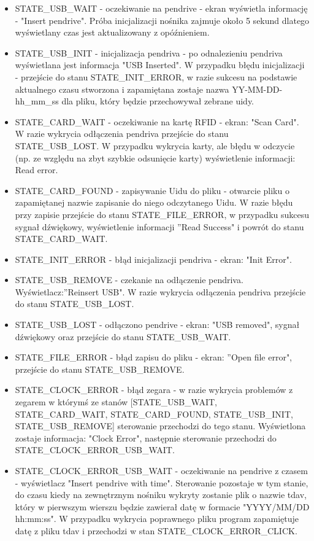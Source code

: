 \documentclass[declaration,shortabstract, mgr]{iithesis}
\begin{document}
\begin{itemize}
\item STATE\_USB\_WAIT - oczekiwanie na pendrive - ekran wyświetla informację - "Insert pendrive". Próba inicjalizacji nośnika zajmuje około 5 sekund dlatego wyświetlany czas jest aktualizowany z opóźnieniem.
\item STATE\_USB\_INIT - inicjalizacja pendriva - po odnalezieniu pendriva wyświetlana jest informacja "USB Inserted". W przypadku błędu inicjalizacji - przejście do stanu STATE\_INIT\_ERROR, w razie sukcesu na podstawie aktualnego czasu stworzona i zapamiętana zostaje nazwa YY-MM-DD-hh\_mm\_ss dla pliku, który będzie przechowywał zebrane uidy.
\item STATE\_CARD\_WAIT - oczekiwanie na kartę RFID - ekran: "Scan Card". W razie wykrycia odłączenia pendriva przejście do stanu STATE\_USB\_LOST. W przypadku wykrycia karty, ale błędu w odczycie (np. ze względu na zbyt szybkie odsunięcie karty) wyświetlenie informacji: Read error.
\item STATE\_CARD\_FOUND - zapisywanie Uidu do pliku - otwarcie pliku o zapamiętanej nazwie zapisanie do niego odczytanego Uidu. W razie błędu przy zapisie przejście do stanu STATE\_FILE\_ERROR, w przypadku sukcesu sygnał dźwiękowy, wyświetlenie informacji ''Read Success" i powrót do stanu STATE\_CARD\_WAIT.
\item STATE\_INIT\_ERROR - błąd inicjalizacji pendriva - ekran: "Init Error".
\item STATE\_USB\_REMOVE - czekanie na odłączenie pendriva. Wyświetlacz:''Reinsert USB". W razie wykrycia odłączenia pendriva przejście do stanu STATE\_USB\_LOST.
\item STATE\_USB\_LOST - odłączono pendrive - ekran: "USB removed", sygnał dźwiękowy oraz przejście do stanu STATE\_USB\_WAIT.
\item STATE\_FILE\_ERROR - błąd zapisu do pliku - ekran: ''Open file error", przejście do stanu STATE\_USB\_REMOVE.
\item STATE\_CLOCK\_ERROR - błąd zegara - w razie wykrycia problemów z zegarem w którymś ze stanów [STATE\_USB\_WAIT, STATE\_CARD\_WAIT, STATE\_CARD\_FOUND, STATE\_USB\_INIT, STATE\_USB\_REMOVE] sterowanie przechodzi do tego stanu. Wyświetlona zostaje informacja: "Clock Error", następnie sterowanie przechodzi do STATE\_CLOCK\_ERROR\_USB\_WAIT.
\item STATE\_CLOCK\_ERROR\_USB\_WAIT - oczekiwanie na pendrive z czasem - wyświetlacz "Insert pendrive with time". Sterowanie pozostaje w tym stanie, do czasu kiedy na zewnętrznym nośniku wykryty zostanie plik o nazwie tdav, który w pierwszym wierszu będzie zawierał datę w formacie "YYYY/MM/DD hh:mm:ss". W przypadku wykrycia poprawnego pliku program zapamiętuje datę z pliku tdav i przechodzi w stan STATE\_CLOCK\_ERROR\_CLICK.\\

\end{itemize}
\end{document}
